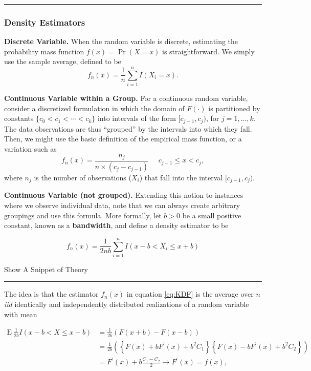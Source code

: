 \documentclass[]{book}
\theoremstyle{definition}
\theoremstyle{definition}
\theoremstyle{definition}
\theoremstyle{remark}
\begin{document}
\begin{center}\rule{0.5\linewidth}{\linethickness}\end{center}

\subsubsection{Density Estimators}\label{density-estimators}

\textbf{Discrete Variable.} When the random variable is discrete,
estimating the probability mass function \(f(x) = \Pr(X=x)\) is
straightforward. We simply use the sample average, defined to be
\[f_n(x) = \frac{1}{n} \sum_{i=1}^n I(X_i = x).\]

\textbf{Continuous Variable within a Group.} For a continuous random
variable, consider a discretized formulation in which the domain of
\(F(\cdot)\) is partitioned by constants
\(\{c_0 < c_1 < \cdots < c_k\}\) into intervals of the form
\([c_{j-1}, c_j)\), for \(j=1, \ldots, k\). The data observations are
thus ``grouped'' by the intervals into which they fall. Then, we might
use the basic definition of the empirical mass function, or a variation
such as
\[f_n(x) = \frac{n_j}{n \times (c_j - c_{j-1})}  \ \ \ \ \ \ c_{j-1} \le x < c_j,\]
where \(n_j\) is the number of observations (\(X_i\)) that fall into the
interval \([c_{j-1}, c_j)\).

\textbf{Continuous Variable (not grouped).} Extending this notion to
instances where we observe individual data, note that we can always
create arbitrary groupings and use this formula. More formally, let
\(b>0\) be a small positive constant, known as a \textbf{bandwidth}, and
define a density estimator to be

\begin{equation} 
  f_n(x) = \frac{1}{2nb} \sum_{i=1}^n I(x-b < X_i \le x + b)
  \label{eq:KDF}
\end{equation}

Show A Snippet of Theory

\hypertarget{Theorykerneldensity}{}
\begin{center}\rule{0.5\linewidth}{\linethickness}\end{center}

The idea is that the estimator \(f_n(x)\) in equation \eqref{eq:KDF} is
the average over \(n\) \emph{iid}{ identically and independently
distributed} realizations of a random variable with mean

\[\begin{aligned}
\mathrm{E~ } \frac{1}{2b} I(x-b < X \le x + b) &=  \frac{1}{2b}\left(F(x+b)-F(x-b)\right) \\
&=  \frac{1}{2b} \left( \left\{ F(x) + b F^{\prime}(x) + b^2 C_1\right\}
\left\{ F(x) - b F^{\prime}(x) + b^2 C_2\right\} \right) \\
&=  F^{\prime}(x) + b \frac{C_1-C_2}{2} \rightarrow  F^{\prime}(x) = f(x),
\end{aligned}\]
\end{document}
